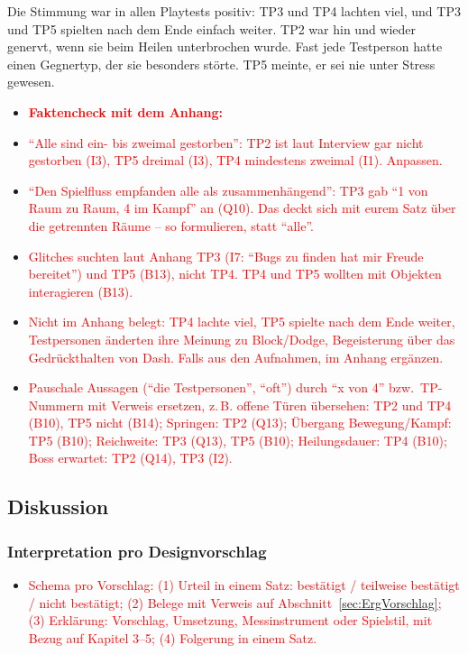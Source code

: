 \documentclass[../Main.tex]{subfiles}
\begin{document}
Die Stimmung war in allen Playtests positiv: TP3 und TP4 lachten viel, und TP3 und TP5 spielten nach dem Ende einfach weiter. TP2 war hin und wieder genervt, wenn sie beim Heilen unterbrochen wurde. Fast jede Testperson hatte einen Gegnertyp, der sie besonders störte. TP5 meinte, er sei nie unter Stress gewesen.

\begin{itemize}[leftmargin=1.5cm]
    \item \textcolor{red}{\textbf{Faktencheck mit dem Anhang:}}
    \item \textcolor{red}{\enquote{Alle sind ein- bis zweimal gestorben}: TP2 ist laut Interview gar nicht gestorben (I3), TP5 dreimal (I3), TP4 mindestens zweimal (I1). Anpassen.}
    \item \textcolor{red}{\enquote{Den Spielfluss empfanden alle als zusammenhängend}: TP3 gab \enquote{1 von Raum zu Raum, 4 im Kampf} an (Q10). Das deckt sich mit eurem Satz über die getrennten Räume -- so formulieren, statt \enquote{alle}.}
    \item \textcolor{red}{Glitches suchten laut Anhang TP3 (I7: \enquote{Bugs zu finden hat mir Freude bereitet}) und TP5 (B13), nicht TP4. TP4 und TP5 wollten mit Objekten interagieren (B13).}
    \item \textcolor{red}{Nicht im Anhang belegt: TP4 lachte viel, TP5 spielte nach dem Ende weiter, Testpersonen änderten ihre Meinung zu Block/Dodge, Begeisterung über das Gedrückthalten von Dash. Falls aus den Aufnahmen, im Anhang ergänzen.}
    \item \textcolor{red}{Pauschale Aussagen (\enquote{die Testpersonen}, \enquote{oft}) durch \enquote{x von 4} bzw.\ TP-Nummern mit Verweis ersetzen, z.\,B. offene Türen übersehen: TP2 und TP4 (B10), TP5 nicht (B14); Springen: TP2 (Q13); Übergang Bewegung/Kampf: TP5 (B10); Reichweite: TP3 (Q13), TP5 (B10); Heilungsdauer: TP4 (B10); Boss erwartet: TP2 (Q14), TP3 (I2).}
\end{itemize}

\subsection{Diskussion}

\subsubsection{Interpretation pro Designvorschlag} \label{sec:Interpretation}

\begin{itemize}[leftmargin=1.5cm]
    \item \textcolor{red}{Schema pro Vorschlag: (1) Urteil in einem Satz: bestätigt / teilweise bestätigt / nicht bestätigt; (2) Belege mit Verweis auf Abschnitt~\ref{sec:ErgVorschlag}; (3) Erklärung: Vorschlag, Umsetzung, Messinstrument oder Spielstil, mit Bezug auf Kapitel 3--5; (4) Folgerung in einem Satz.}
\end{itemize}
\end{document}
